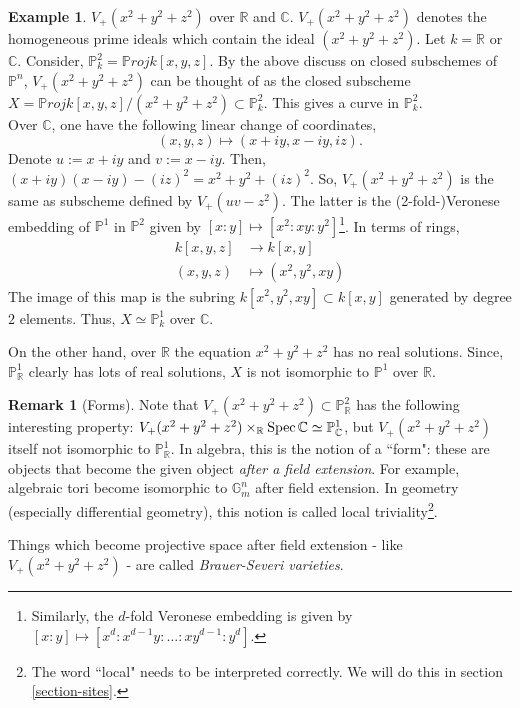 \documentclass[11pt]{amsart}
\newcommand{\Proj}{{\P roj}}
\newcommand{\Spec}{{\rm Spec \,}}
\newcommand{\C}{{\mathbb C}}
\newcommand{\G}{{\mathbb G}}
\renewcommand{\P}{{\mathbb P}}
\newcommand{\R}{{\mathbb R}}
\theoremstyle{definition}
\newtheorem{example}[theorem]{Example}
\newtheorem{remark}[theorem]{Remark}
\begin{document}
\begin{example}
$V_{+}(x^2+y^2+z^2)$ over $\R$ and $\C$. $V_{+}(x^2+y^2+z^2)$ denotes the homogeneous prime ideals which contain the ideal $(x^2+y^2+z^2)$. Let $k=\R$ or $\C$. Consider, $\P_k^2=\Proj k[x,y,z]$. By the above discuss on closed subschemes of $\P^n$, $V_{+}(x^2+y^2+z^2)$ can be thought of as the closed subscheme $X=\Proj k[x,y,z]/(x^2+y^2+z^2)\subset \P_k^2$. This gives a curve in $\P_k^2$.\\
Over $\C$, one have the following linear change of coordinates, 
\[(x,y,z)\mapsto (x+iy,x-iy,iz).\] 
Denote $u:=x+iy$ and $v:=x-iy$. Then, $(x+iy) (x-iy) -(iz)^2= x^2+y^2+(iz)^2$. So, $V_{+}(x^2+y^2+z^2)$ is the same as subscheme defined by $V_+(uv-z^2)$. The latter is the (2-fold-)Veronese embedding of $\P^1$ in $\P^2$ given by $[x:y]\mapsto [x^2:xy:y^2]$\footnote{Similarly, the $d$-fold Veronese embedding is given by $[x:y]\mapsto [x^d:x^{d-1}y:\ldots:xy^{d-1}:y^d]$.}. In terms of rings,
\begin{align*}
k[x,y,z]&\rightarrow k[x,y]\\
(x,y,z)&\mapsto (x^2,y^2,xy)
\end{align*}
The image of this map is the subring $k[x^2,y^2,xy]\subset k[x,y]$ generated by degree $2$ elements. Thus, $X\simeq \P_{k}^1$ over $\C$.

On the other hand, over $\R$ the equation $x^2+y^2+z^2$ has no real solutions. Since, $\P_{\R}^1$ clearly has lots of real solutions, $X$ is not isomorphic to $\P^1$ over $\R$.
\end{example}


\begin{remark}[Forms]
	Note that $V_+(x^2+y^2+z^2)\subset \P_{\R}^2$ has the following interesting property: $V_+(x^2+y^2+z^2)\times_{\R}\Spec \C\simeq \P_{\C}^1$, but $V_+(x^2+y^2+z^2)$ itself not isomorphic to $\P_{\R}^1$. In algebra, this is the notion of a ``form": these are objects that become the given object \textit{after a field extension}. For example, algebraic tori become isomorphic to $\G_m^n$ after field extension. In geometry (especially differential geometry), this notion is called local triviality\footnote{The word ``local" needs to be interpreted correctly. We will do this in section \ref{section-sites}.}.
	
	Things which become projective space after field extension - like $V_+(x^2+y^2+z^2)$ - are called  \textit{Brauer-Severi varieties}.
\end{remark}
\end{document}
